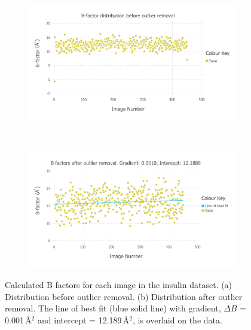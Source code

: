\begin{figure}
    \centering
    \begin{subfigure}[b]{1.0\textwidth}
            \centering
            \includegraphics[width=\textwidth]{figures/datared/BFac_Plot_Before_outlier_removal.pdf}
            \caption{}
            \label{fig:B factors per image before outlier removal - insulin}
    \end{subfigure}
    \\
    \begin{subfigure}[b]{1.0\textwidth}
            \centering
            \includegraphics[width=\textwidth]{figures/datared/BFac_Plot_After_outlier_removal.pdf}
            \caption{}
            \label{fig:B factors per image after outlier removal - insulin}
    \end{subfigure}
    \caption[Calculated B factors for each image in the insulin dataset.]{Calculated B factors for each image in the insulin dataset.
    (a) Distribution before outlier removal.
    (b) Distribution after outlier removal.
    The line of best fit (blue solid line) with gradient, $\Delta B$ = 0.001$\,$\AA$^{\text{2}}$ and intercept = 12.189$\,$\AA$^{\text{2}}$, is overlaid on the data.}
    \label{fig:B factors per image - insulin}
\end{figure}

